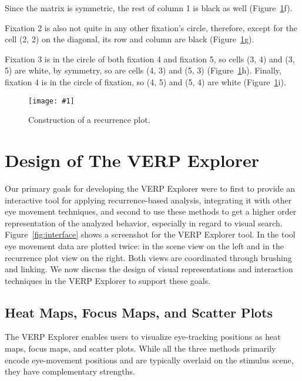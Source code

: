 \documentclass{sigchi}
\newcommand{\insertpicture}[2]{\begin{center}\texttt{[image: \#1]}\end{center}}
\begin{document}
Since the matrix is symmetric, the rest of column 1 is black as well
(Figure~\ref{fig:construct}f). 

Fixation 2  is also not quite in any other fixation’s circle, therefore,
except for the cell (2, 2) on the diagonal, its row and column are black
(Figure~\ref{fig:construct}g). 

Fixation 3 is in the circle of both fixation 4  and fixation 5, so cells
(3, 4) and (3, 5) are white, by symmetry, so are cells (4, 3) and (5, 3)
(Figure~\ref{fig:construct}h). Finally, fixation 4 is in the circle of fixation,
so (4, 5) and (5, 4) are white (Figure~\ref{fig:construct}i).


\begin{figure}
	\insertpicture{figures/rpconstruction.pdf}{0.45}
	\caption{ Construction of a recurrence plot. \label{fig:construct}}
\end{figure}




\section{Design of The VERP Explorer}
Our primary goals for developing the VERP Explorer were to first to provide
an interactive tool for applying recurrence-based analysis, integrating it
with other eye movement techniques, and second to use these methods to get
a higher order representation of the analyzed behavior, especially in
regard to visual search. Figure~\ref{fig:interface} shows a screenshot 
for the VERP Explorer tool.  In the tool eye movement data are plotted 
twice: in the scene view on the left and in the recurrence plot view on the right.  
Both views are coordinated through brushing and linking. We now discuss the design of
visual representations and interaction techniques in the VERP Explorer to
support these goals. 

\subsection{Heat Maps, Focus Maps, and Scatter Plots} 
The VERP Explorer enables users to visualize eye-tracking positions 
as heat maps, focus maps, and scatter plots. While all the three
methods primarily encode eye-movement positions and are typically 
overlaid on the stimulus scene, they have complementary strengths.  
\end{document}
